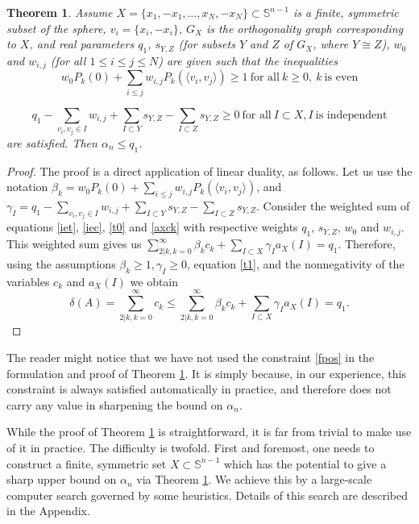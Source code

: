 \documentclass[11pt]{amsart}
\newtheorem{theorem}{Theorem}[section]
\numberwithin{equation}{section}
\newcommand{\Sp}{\mathbb S}
\begin{document}
\begin{theorem}\label{bound}
Assume $X=\{x_1, -x_1, \dots, x_N, -x_N\}\subset \Sp^{n-1}$ is a finite, symmetric subset of the sphere, $v_i=\{x_i, -x_i\}$, $G_X$ is the orthogonality graph corresponding to $X$, and real parameters $q_1$, $s_{Y,Z}$ (for subsets $Y$ and $Z$ of $G_X$, where $Y\cong Z$), $w_0$ and $w_{i,j}$ (for all $1\le i\le j\le N$)  are given such that the inequalities 
\begin{equation}\label{forck}
w_0P_k(0) + \sum_{i\le j}w_{i,j}P_k(\langle v_i, v_j \rangle )\ge 1 \ {\textrm{for all}} \ k\ge 0, \ k \  {\textrm{is even}} 
\end{equation}

\begin{equation}\label{forax}
q_1 - \sum_{v_i, v_j\in I}w_{i,j} + \sum_{I\subset Y}s_{Y,Z} -\sum_{I\subset Z}s_{Y,Z}\ge 0 \ {\textrm{for all}} \ I\subset X, I \  {\textrm{is independent}}
\end{equation}
are satisfied. Then $\alpha_n\le q_1$.    
\end{theorem}
\begin{proof}
The proof is a direct application of linear duality, as follows. Let us use the notation 
$\beta_k=w_0P_k(0)+\sum_{i\le j}w_{i,j}P_k(\langle v_i, v_j \rangle )$, and $\gamma_I=q_1 - \sum_{v_i, v_j\in I}w_{i,j} + \sum_{I\subset Y}s_{Y,Z} -\sum_{I\subset Z}s_{Y,Z}$. Consider the weighted sum of equations \eqref{iet}, \eqref{iec}, \eqref{t0} and \eqref{axck} with respective weights $q_1$, $s_{Y,Z}$, $w_0$ and $w_{i,j}$. This weighted sum gives us $\sum_{2|k, k=0}^\infty \beta_k c_k +\sum_{I\subset X}\gamma_Ia_X(I)= q_1$. Therefore, using the assumptions $\beta_k\ge 1, \gamma_I\ge 0$, equation \eqref{t1}, and the nonnegativity of the variables $c_k$ and  $a_X(I)$ we obtain 
\begin{equation}\label{last}
\delta(A)=\sum_{2|k, k=0}^\infty  c_k \le \sum_{2|k, k=0}^\infty \beta_k c_k +\sum_{I\subset X}\gamma_Ia_X(I) =q_1.       
\end{equation}
\end{proof}

The reader might notice that we have not used the constraint \eqref{fpos} in the formulation and proof of Theorem \ref{bound}. It is simply because, in our experience, this constraint is always satisfied automatically in practice, and therefore does not carry any value in sharpening the bound on $\alpha_n$. 

\medskip

While the proof of Theorem \ref{bound} is straightforward, it is far from trivial to make use of it in practice. The difficulty is twofold. First and foremost, one needs to construct a finite, symmetric set $X\subset \Sp^{n-1}$ which has the potential to give a sharp upper bound on $\alpha_n$ via Theorem \ref{bound}. We achieve this by a large-scale computer search governed by some heuristics. Details of this search are described in the Appendix. 
\end{document}
